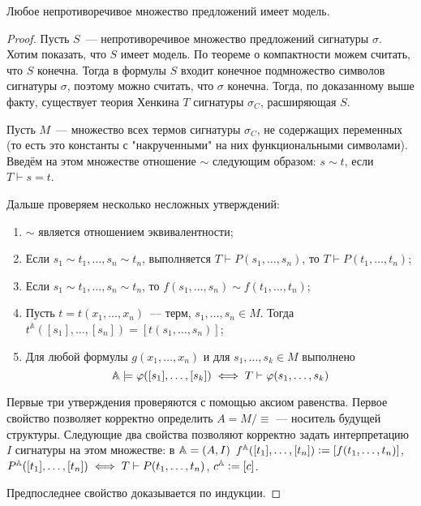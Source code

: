\begin{theorem}
Любое непротиворечивое множество предложений имеет модель.
\end{theorem}

\begin{proof}
    Пусть $S$~— непротиворечивое множество предложений сигнатуры $\sigma$. Хотим показать, что $S$ имеет модель. По теореме о компактности можем считать, что $S$ конечна. Тогда в формулы $S$ входит конечное подмножество символов сигнатуры $\sigma$, поэтому можно считать, что $\sigma$ конечна. Тогда, по доказанному выше факту, существует теория Хенкина $T$ сигнатуры $\sigma_C$, расширяющая $S$.

    Пусть $M$~— множество всех термов сигнатуры $\sigma_C$, не содержащих переменных (то есть это константы с "накрученными" на них функциональными символами). Введём на этом множестве отношение $\sim$ следующим образом: $s\sim t$, если $T\vdash s=t$.

    Дальше проверяем несколько несложных утверждений:
    \begin{enumerate}
        \item $\sim$ является отношением эквивалентности;
        \item Если $s_1\sim t_1, \ldots, s_n\sim t_n$, выполняется $T\vdash P(s_1, \ldots, s_n)$, то $T\vdash P(t_1, \ldots, t_n)$;
        \item Если $s_1\sim t_1, \ldots, s_n\sim t_n$, то $f(s_1, \ldots, s_n)\sim f(t_1, \ldots, t_n)$;
        \item Пусть $t = t(x_1, \ldots, x_n)$~— терм, $s_1, \ldots, s_n\in M$. Тогда $t^\mathbb{A}([s_1], \ldots, [s_n]) = [t(s_1, \ldots, s_n)]$;
        \item Для любой формулы $g(x_1, \dots, x_n)$ и для $s_1, \dots, s_k\in M$ выполнено $${\mathbb A}\models \varphi([s_1], \dots, [s_k]) \iff T\vdash \varphi(s_1, \dots, s_k)$$
    \end{enumerate}
    Первые три утверждения проверяются с помощью аксиом равенства. Первое свойство позволяет корректно определить $A = M/\equiv$ — носитель будущей структуры. Следующие два свойства позволяют корректно задать интерпретацию $I$ сигнатуры на этом множестве: в ${\mathbb A} = (A, I)$ $f^{\mathbb A}([t_1], \dots, [t_n])\vcentcolon=[f(t_1, \dots, t_n)]$, $P^{\mathbb A}([t_1],\dots,[t_n])\iff T\vdash P(t_1, \dots, t_n)$, $c^{\mathbb A}\vcentcolon= [c]$.

    Предпоследнее свойство доказывается по индукции.
\end{proof}

